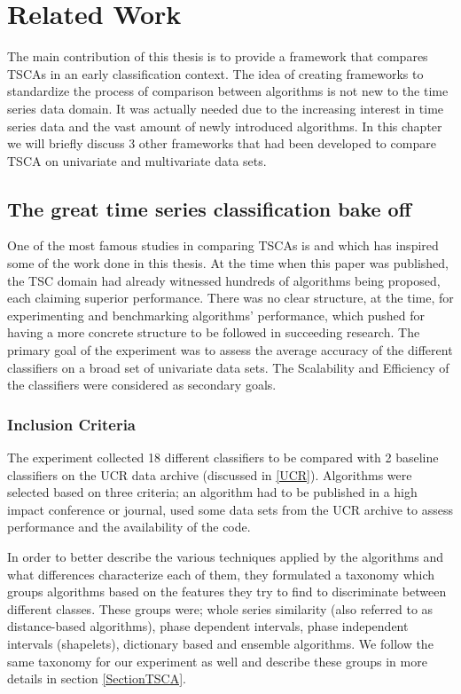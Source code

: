 \chapter{Related Work}
\label{ChapterRelatedWork}
The main contribution of this thesis is to provide a framework that compares TSCAs in an early classification context.
The idea of creating frameworks to standardize the process of comparison between algorithms is not new to the time series data domain.
It was actually needed due to the increasing interest in time series data and the vast amount of newly introduced algorithms.
In this chapter we will briefly discuss 3 other frameworks that had been developed to compare TSCA on univariate and multivariate data sets.

\section{The great time series classification bake off}
\label{GreatBakeoffUnivariate}
One of the most famous studies in comparing TSCAs is \cite{bagnall2017great} and which has inspired some of the work done in this thesis.
At the time when this paper was published, the TSC domain had already witnessed hundreds of algorithms being proposed, each claiming superior performance.
There was no clear structure, at the time, for experimenting and benchmarking algorithms' performance, which pushed for having a more concrete structure to be followed in succeeding research.
The primary goal of the experiment was to assess the average accuracy of the different classifiers on a broad set of univariate data sets.
The Scalability and Efficiency of the classifiers were considered as secondary goals.

\subsection{Inclusion Criteria}
\label{subsectionUniBakeoffInclusion}
The experiment collected 18 different classifiers to be compared with 2 baseline classifiers on the UCR data archive (discussed in \ref{UCR}).
Algorithms were selected based on three criteria; an algorithm had to be published in a high impact conference or journal, used some data sets from the UCR archive to assess performance
and the availability of the code.

In order to better describe the various techniques applied by the algorithms and what differences characterize each of them, they formulated a taxonomy which 
groups algorithms based on the features they try to find to discriminate between different classes.
These groups were; whole series similarity (also referred to as distance-based algorithms), phase dependent intervals, phase independent intervals (shapelets), dictionary based and ensemble algorithms.
We follow the same taxonomy for our experiment as well and describe these groups in more details in section \ref{SectionTSCA}.

